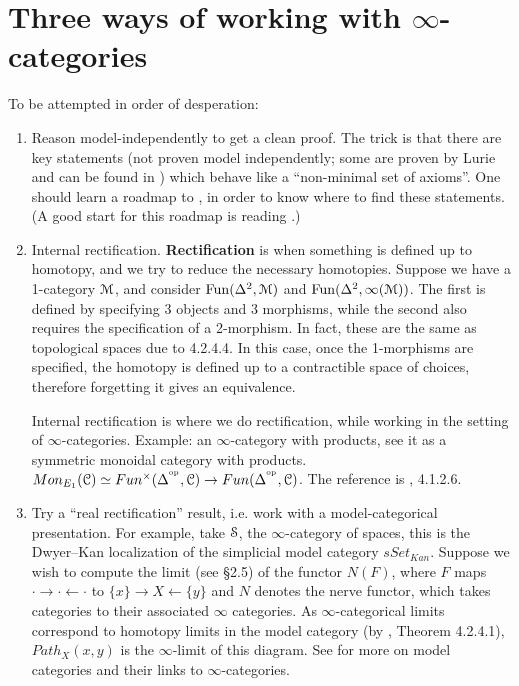 \documentclass[10pt,a4paper,reqno,oneside]{book} %
\theoremstyle{plain}
\theoremstyle{definition}
\theoremstyle{remark}
\numberwithin{equation}{section}
\begin{document}
\section{Three ways of working with $\infty$-categories}
To be attempted in order of desperation:
\begin{enumerate}
\item \label{model_indep} 
Reason model-independently to get a clean proof. The trick is that there are key statements (not proven model
independently; some are proven by Lurie and can be found in \cite{HTT}) which behave like a ``non-minimal set of axioms''.
One should learn a roadmap to \cite{HTT}, in order to know where to find these statements. (A good start for this roadmap is
reading \cite{groth}.)

\item 
\label{item:internal_rectification}
Internal rectification. 
\textbf{Rectification} is when something is defined up to homotopy, and we try to reduce the necessary homotopies. Suppose we have
a 1-category
$\mathcal M$, and consider $\operatorname{Fun}(\Delta^2,\mathcal M)$ and $\operatorname{Fun}(\Delta^2, \infty( \mathcal M))$. The first is defined by specifying 3 objects and 3 morphisms, while
the second also requires the specification of a 2-morphism. In fact, these are the same as topological spaces due 
to \cite{HTT} 4.2.4.4. In this case, once the 1-morphisms are specified, the homotopy is defined up to a contractible space of choices, therefore forgetting it gives an equivalence.

Internal rectification is where we do rectification, while working in the setting of $\infty$-categories.
 Example: an $\infty$-category with
products, see it as a symmetric monoidal category with products. $Mon_{E_1}(\mathcal C) \simeq Fun^{\times}(\Delta^{^\mathrm{op}}, \mathcal C)
\to Fun(\Delta^{^\mathrm{op}}, \mathcal C)$.
The reference is \cite{Lurie_Higher_algebra}, 4.1.2.6. 

\item \label{item:real_rectification}
Try a ``real rectification'' result, i.e. work with a model-categorical presentation. For example, take $\mathcal S$,
the $\infty$-category
of spaces,  this is the Dwyer--Kan localization of the simplicial model category $sSet_{Kan}$. Suppose we wish to compute the limit (see \cite{groth} \S 2.5) of the functor $N(F)$, where $F$ maps $\cdot \rightarrow \cdot \leftarrow \cdot$ to $\{x\} \rightarrow X \leftarrow \{y\}$ and $N$ denotes the nerve functor, which takes categories to their associated $\infty$ categories. As
$\infty$-categorical limits correspond to homotopy limits in the model category (by \cite{HTT}, Theorem 4.2.4.1),  $Path_X(x,y)$ is the $\infty$-limit
of this diagram. See \cite{vezzosi2013autour} for more on model categories and their links to $\infty$-categories.


\end{enumerate}
\end{document}
